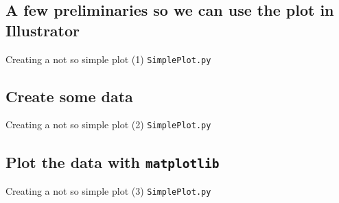 \documentclass[t]{beamer}
\begin{document}
\subsection{A few preliminaries so we can use the plot in Illustrator}
\begin{frame}{Creating a not so simple plot (1)}
  \small{\texttt{SimplePlot.py}}
  \vspace{-15pt}\begin{figure}[ht]
  \centering
        \lstset{numbers=left}
        
   \end{figure}
\end{frame}

\subsection{Create some data}
\begin{frame}{Creating a not so simple plot (2)}
  \small{\texttt{SimplePlot.py}}
  \vspace{-15pt}\begin{figure}[ht]
  \centering
        \lstset{numbers=left}
        
   \end{figure}
\end{frame}

\subsection{Plot the data with \texttt{matplotlib}}
\begin{frame}{Creating a not so simple plot (3)}
  \small{\texttt{SimplePlot.py}}
  \vspace{-15pt}\begin{figure}[ht]
  \centering
        \lstset{numbers=left}
        
   \end{figure}
\end{frame}
\end{document}

